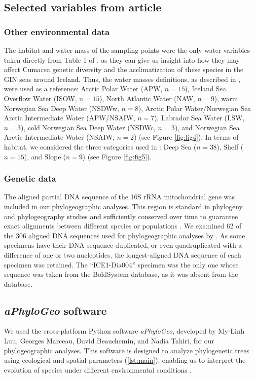 {\subsection{Selected variables from article \cite{uhlir_adding_2021}}
\subsubsection{Other environmental data}
The habitat and water mass of the sampling points were the only water variables taken directly from Table 1 of \citep{uhlir_adding_2021}, as they can give us insight into how they may affect Cumacea genetic diversity and the acclimatization of these species in the GIN seas around Iceland. Thus, the water masses definitions, as described in \citep{uhlir_adding_2021}, were used as a reference: Arctic Polar Water (APW, $n=15$), Iceland Sea Overflow Water (ISOW, $n=15$), North Atlantic Water (NAW, $n=9$), warm Norwegian Sea Deep Water (NSDWw, $n=8$), Arctic Polar Water/Norwegian Sea Arctic Intermediate Water (APW/NSAIW, $n=7$), Labrador Sea Water (LSW, $n=3$), cold Norwegian Sea Deep Water (NSDWc, $n=3$), and Norwegian Sea Arctic Intermediate Water (NSAIW, $n=2$) (see Figure \ref{fig:fig4}). In terms of habitat, we considered the three categories used in \citep{uhlir_adding_2021}: Deep Sea ($n=38$), Shelf ($n=15$), and Slope ($n=9$) (see Figure \ref{fig:fig5}).

\subsubsection{Genetic data}
The aligned partial DNA sequence of the 16S rRNA mitochondrial gene was included in our phylogeographic analyses. This region is standard in phylogeny and phylogeography studies \citep{hugenholtz1998impact} and sufficiently conserved over time to guarantee exact alignments between different species or populations \citep{saccone1999evolutionary}. We examined 62 of the 306 aligned DNA sequences used for phylogeographic analyses by \citep{uhlir_adding_2021}. As some specimens have their DNA sequence duplicated, or even quadruplicated with a difference of one or two nucleotides, the longest-aligned DNA sequence of each specimen was retained. The ``ICE1-Dia004'' specimen was the only one whose sequence was taken from the BoldSystem database, as it was absent from the \citep{uhlir_adding_2021} database.

\subsection{{\textit{aPhyloGeo} software}\label{aPhyloGeo-software}}
We used the cross-platform Python software \textit{aPhyloGeo}, developed by My-Linh Luu, Georges Marceau, David Beauchemin, and Nadia Tahiri, for our phylogeographic analyses. This software is designed to analyze phylogenetic trees using ecological and spatial parameters (\autoref{lst:main}), enabling us to interpret the evolution of species under different environmental conditions \citep{koshkarov_phylogeography_2022}.

}
